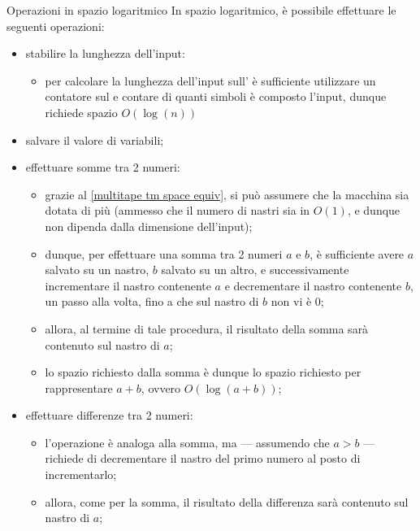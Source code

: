 \documentclass[a4paper, 12pt]{report}
\begin{document}
    \begin{framedprop}[label={log space ops}, breakable]{Operazioni in spazio logaritmico}
        In spazio logaritmico, è possibile effettuare le seguenti operazioni:

        \begin{itemize}
            \item stabilire la lunghezza dell'input:
                \begin{itemize}
                    \item per calcolare la lunghezza dell'input sull' è sufficiente utilizzare un contatore sul  e contare di quanti simboli è composto l'input, dunque richiede spazio $O(\log(n))$
                \end{itemize}
            \item salvare il valore di variabili;
            \item effettuare somme tra 2 numeri:
                \begin{itemize}
                    \item grazie al \cref{multitape tm space equiv}, si può assumere che la macchina sia dotata di più  (ammesso che il numero di nastri sia in $O(1)$, e dunque non dipenda dalla dimensione dell'input);
                    \item dunque, per effettuare una somma tra 2 numeri $a$ e $b$, è sufficiente avere $a$ salvato su un nastro, $b$ salvato su un altro, e successivamente incrementare il nastro contenente $a$ e decrementare il nastro contenente $b$, un passo alla volta, fino a che sul nastro di $b$ non vi è 0;
                    \item allora, al termine di tale procedura, il risultato della somma sarà contenuto sul nastro di $a$;
                    \item lo spazio richiesto dalla somma è dunque lo spazio richiesto per rappresentare $a + b$, ovvero $O(\log(a + b))$;
                \end{itemize}
            \item effettuare differenze tra 2 numeri:
                \begin{itemize}
                    \item l'operazione è analoga alla somma, ma --- assumendo che $a > b$ --- richiede di decrementare il nastro del primo numero al posto di incrementarlo;
                    \item allora, come per la somma, il risultato della differenza sarà contenuto sul nastro di $a$;

\end{itemize}
\end{itemize}
\end{framedprop}
\end{document}
